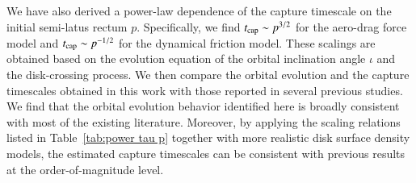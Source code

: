 \documentclass[aps,prx,reprint,superscriptaddress,nofootinbib,longbibliography]{revtex4-1}
\begin{document}
We have also derived a power-law dependence of the capture timescale on the initial semi-latus rectum $p$. Specifically, we find $t_{\rm cap}\sim p^{3/2}$ for the aero-drag force model and $t_{\rm cap}\sim p^{-1/2}$ for the dynamical friction model. These scalings are obtained based on the evolution equation of the orbital inclination angle $\iota$ and the disk-crossing process. 
We then compare the orbital evolution and the capture timescales obtained in this work with those reported in several previous studies. We find that the orbital evolution behavior identified here is broadly consistent with most of the existing literature. Moreover, by applying the scaling relations listed in Table~\ref{tab:power tau p} together with more realistic disk surface density models, the estimated capture timescales can be consistent with previous results at the order-of-magnitude level. 

\end{document}
